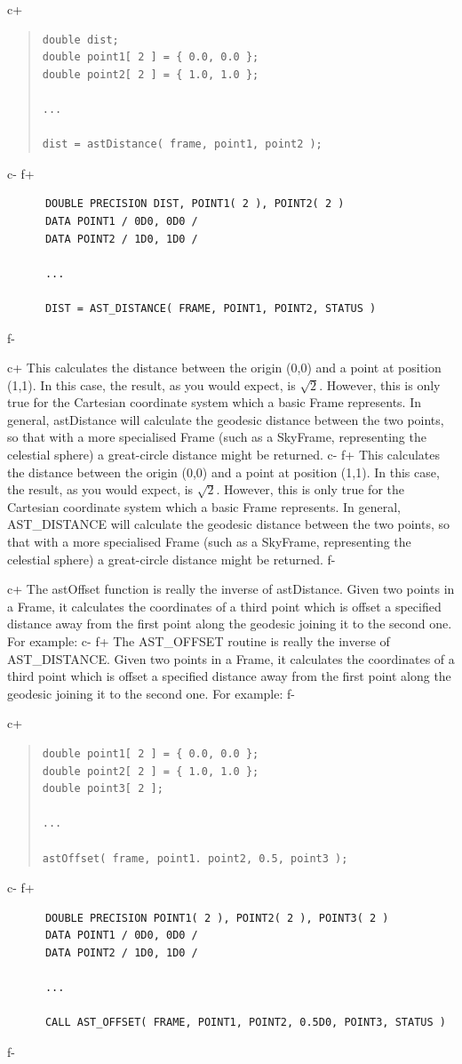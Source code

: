 \documentclass[twoside,11pt]{article}
\begin{document}
c+
\begin{quote}
\small
\begin{verbatim}
double dist;
double point1[ 2 ] = { 0.0, 0.0 };
double point2[ 2 ] = { 1.0, 1.0 };

...

dist = astDistance( frame, point1, point2 );
\end{verbatim}
\normalsize
\end{quote}
c-
f+
\small
\begin{verbatim}
      DOUBLE PRECISION DIST, POINT1( 2 ), POINT2( 2 )
      DATA POINT1 / 0D0, 0D0 /
      DATA POINT2 / 1D0, 1D0 /

      ...

      DIST = AST_DISTANCE( FRAME, POINT1, POINT2, STATUS )
\end{verbatim}
\normalsize
f-

c+
This calculates the distance between the origin (0,0) and a point at
position (1,1). In this case, the result, as you would expect, is
$\surd{2}$. However, this is only true for the Cartesian coordinate
system which a basic Frame represents. In general, astDistance will
calculate the geodesic distance between the two points, so that with a
more specialised Frame (such as a SkyFrame, representing the celestial
sphere) a great-circle distance might be returned.
c-
f+
This calculates the distance between the origin (0,0) and a point at
position (1,1). In this case, the result, as you would expect, is
$\surd{2}$. However, this is only true for the Cartesian coordinate
system which a basic Frame represents. In general, AST\_DISTANCE will
calculate the geodesic distance between the two points, so that with a
more specialised Frame (such as a SkyFrame, representing the celestial
sphere) a great-circle distance might be returned.
f-

c+
The astOffset function is really the inverse of astDistance. Given two
points in a Frame, it calculates the coordinates of a third point
which is offset a specified distance away from the first point along
the geodesic joining it to the second one. For example:
c-
f+
The AST\_OFFSET routine is really the inverse of AST\_DISTANCE. Given
two points in a Frame, it calculates the coordinates of a third point
which is offset a specified distance away from the first point along
the geodesic joining it to the second one. For example:
f-

c+
\begin{quote}
\small
\begin{verbatim}
double point1[ 2 ] = { 0.0, 0.0 };
double point2[ 2 ] = { 1.0, 1.0 };
double point3[ 2 ];

...

astOffset( frame, point1. point2, 0.5, point3 );
\end{verbatim}
\normalsize
\end{quote}
c-
f+
\small
\begin{verbatim}
      DOUBLE PRECISION POINT1( 2 ), POINT2( 2 ), POINT3( 2 )
      DATA POINT1 / 0D0, 0D0 /
      DATA POINT2 / 1D0, 1D0 /

      ...

      CALL AST_OFFSET( FRAME, POINT1, POINT2, 0.5D0, POINT3, STATUS )
\end{verbatim}
\normalsize
f-
\end{document}
